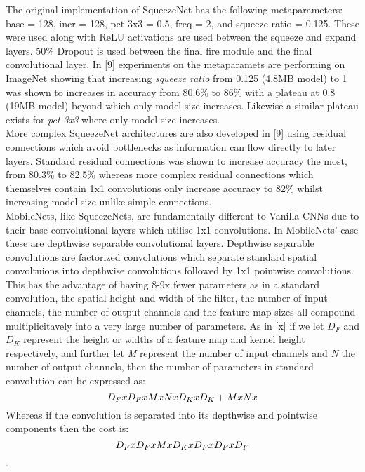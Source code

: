 \documentclass{article}
\begin{document}
The original implementation of SqueezeNet has the following metaparameters: base = 128, incr = 128, pct 3x3 = 0.5, freq = 2, and squeeze ratio = 0.125. These were used along with ReLU activations are used between the squeeze and expand layers. 50\% Dropout is used between the final fire module and the final convolutional layer. In [9] experiments on the metaparamets are performing on ImageNet showing that increasing \emph{squeeze ratio} from 0.125 (4.8MB model) to 1 was shown to increases in accuracy from 80.6\% to 86\% with a plateau at 0.8 (19MB model) beyond which only model size increases. Likewise a similar plateau exists for \emph{pct 3x3} where only model size increases.\\

More complex SqueezeNet architectures are also developed in [9] using residual connections which avoid bottlenecks as information can flow directly to later layers. Standard residual connections was shown to increase accuracy the most, from 80.3\% to 82.5\% whereas more complex residual connections which themselves contain 1x1 convolutions only increase accuracy to 82\% whilst increasing model size unlike simple connections.\\

MobileNets, like SqueezeNets, are fundamentally different to Vanilla CNNs due to their base convolutional layers which utilise 1x1 convolutions. In MobileNets' case these are depthwise separable convolutional layers. Depthwise separable convolutions are factorized convolutions which separate standard spatial convoltuions into depthwise convolutions followed by 1x1 pointwise convolutions.\\

This has the advantage of having 8-9x fewer parameters as in a standard convolution, the spatial height and width of the filter, the number of input channels, the number of output channels and the feature map sizes all compound multiplicitavely into a very large number of parameters. As in [x] if we let \emph{$D_{F}$} and \emph{$D_{K}$} represent the height or widths of a feature map and kernel height respectively, and further let \emph{M} represent the number of input channels and \emph{N} the number of output channels, then the number of parameters in standard convolution can be expressed as: \[\emph{$D_{F}$} x \emph{$D_{F}$} x M x N x \emph{$D_{K}$} x \emph{$D_{K}$} + M x N x \] Whereas if the convolution is separated into its depthwise and pointwise components then the cost is: \[\emph{$D_{F}$} x \emph{$D_{F}$} x M x \emph{$D_{K}$} x \emph{$D_{F}$} x \emph{$D_{F}$} x \emph{$D_{F}$}\].\\
\end{document}
